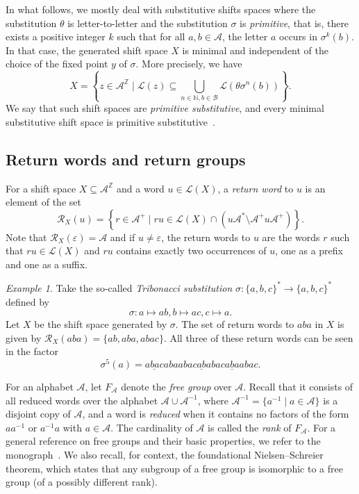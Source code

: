 \documentclass{amsart}
\newcommand*{\nn}{\mathbb{N}}
\newcommand*{\zz}{\mathbb{Z}}
\newcommand*{\Z}{\mathbb{Z}}
\newcommand*{\ret}{\mathcal{R}}
\newcommand*{\lang}{\mathcal{L}}
\newcommand*{\cA}{\mathcal{A}}
\newcommand*{\cB}{\mathcal{B}}
\newcommand*{\from}{\colon}
\newcommand*{\emptyw}{\varepsilon}
\theoremstyle{plain}
\theoremstyle{definition}
\theoremstyle{remark}
\newtheorem{example}[theorem]{Example}
\begin{document}
In what follows, we mostly deal with substitutive shifts spaces where the substitution $\theta$ is letter-to-letter and the substitution $\sigma$ is {\em primitive}, that is, there exists a positive integer $k$ such that for all $a,b \in \cA$, the letter $a$ occurs in $\sigma^k(b)$.
In that case, the generated shift space $X$ is minimal and independent of the choice of the fixed point $y$ of $\sigma$. More precisely, we have
\[
    X = \left\{z \in \cA^\zz \mid \lang(z) \subseteq \bigcup_{n \in \nn, b \in \cB}\lang(\theta\sigma^n(b))\right\}.
\]
We say that such shift spaces are {\em primitive substitutive}, and every minimal substitutive shift space is primitive substitutive~\cite{Durand1998}.

\subsection{Return words and return groups}

For a shift space $X\subseteq\cA^\Z$ and a word $u \in \lang(X)$, a \emph{return word} to $u$ is an element of the set
\begin{equation*}
    \ret_X(u) = \left\{ r\in \cA^+ \mid ru\in \lang(X)\cap (u\cA^*\setminus \cA^+u\cA^+)\right\}.
\end{equation*}
Note that $\ret_X(\emptyw) = \cA$ and if $u\neq\emptyw$, the return words to $u$ are the words $r$ such that $ru \in \lang(X)$ and $ru$ contains exactly two occurrences of $u$, one as a prefix and one as a suffix.

\begin{example}\label{eg:Tribo}
    Take the so-called \emph{Tribonacci substitution} $\sigma\from \{a,b,c\}^*\to \{a,b,c\}^*$ defined by 
    \begin{equation*}
        \sigma\from a\mapsto ab, b\mapsto ac, c\mapsto a.
    \end{equation*}
    Let $X$ be the shift space generated by $\sigma$. The set of return words to $aba$ in $X$ is given by $\ret_X(aba) = \{ab, aba, abac\}$.
    All three of these return words can be seen in the factor 
    \[
    \sigma^5(a) = \underline{abac}abaabac\underline{ab}abac\underline{aba}abac.
    \]
\end{example}

For an alphabet $\cA$, let $F_\cA$ denote the \emph{free group} over $\cA$. Recall that it consists of all reduced words over the alphabet $\cA\cup \cA^{-1}$, where $\cA^{-1} = \{a^{-1} \mid a\in \cA\}$ is a disjoint copy of $\cA$, and a word is \emph{reduced} when it contains no factors of the form $aa^{-1}$ or $a^{-1}a$ with $a\in \cA$. The cardinality of $\cA$ is called the \emph{rank} of $F_\cA$. For a general reference on free groups and their basic properties, we refer to the monograph~\cite{Lyndon2001}. We also recall, for context, the foundational Nielsen--Schreier theorem, which states that any subgroup of a free group is isomorphic to a free group (of a possibly different rank). 
\end{document}
